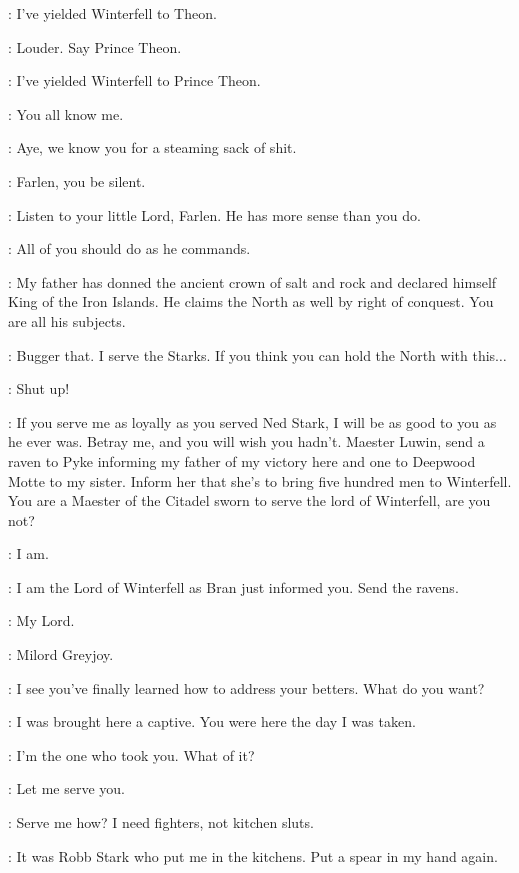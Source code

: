 \BRAN: I've yielded Winterfell to Theon. 

\THEON: Louder. Say Prince Theon. 

\BRAN: I've yielded Winterfell to Prince Theon. 

\THEON: You all know me. 

\FARLEN: Aye, we know you for a steaming sack of shit. 

\BRAN: Farlen, you be silent. 

\THEON: Listen to your little Lord, Farlen. He has more sense than you do. 

\BRAN: All of you should do as he commands. 

\THEON: My father has donned the ancient crown of salt and rock and declared himself King of the Iron Islands. He claims the North as well by right of conquest. You are all his subjects. 

\FARLEN: Bugger that. I serve the Starks. If you think you can hold the North with this$\ldots$

\DRENNAN: Shut up! 

\THEON: If you serve me as loyally as you served Ned Stark, I will be as good to you as he ever was. Betray me, and you will wish you hadn't. Maester Luwin, send a raven to Pyke informing my father of my victory here and one to Deepwood Motte to my sister. Inform her that she's to bring five hundred men to Winterfell.  You are a Maester of the Citadel sworn to serve the lord of Winterfell, are you not? 

\LUWIN: I am. 

\THEON: I am the Lord of Winterfell as Bran just informed you. Send the ravens. 

\LUWIN: My Lord. 

\OSHA: Milord Greyjoy. 

\THEON: I see you've finally learned how to address your betters. What do you want? 

\OSHA: I was brought here a captive. You were here the day I was taken. 

\THEON: I'm the one who took you. What of it? 

\OSHA:  Let me serve you.

\THEON: Serve me how? I need fighters, not kitchen sluts. 

\OSHA: It was Robb Stark who put me in the kitchens. Put a spear in my hand again. 

